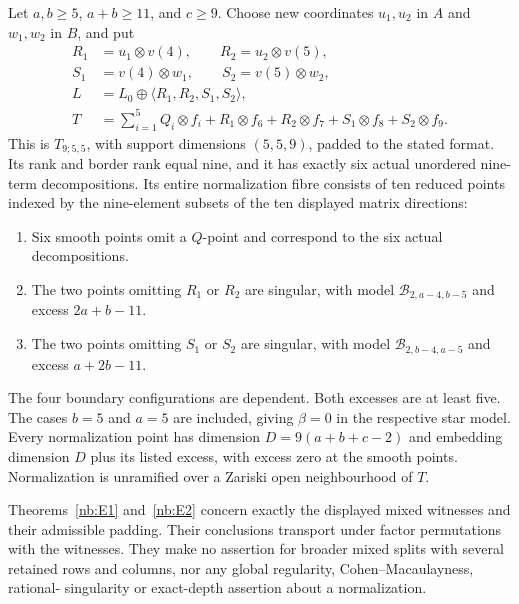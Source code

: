 \begin{theorem}\label{nb:E2}
Let $a,b\geq5$, $a+b\geq11$, and $c\geq9$. Choose new coordinates
$u_1,u_2$ in $A$ and $w_1,w_2$ in $B$, and put
\begin{equation}\label{nb:E2-witness}
 \begin{split}
 R_1&=u_1\otimes v(4),\qquad R_2=u_2\otimes v(5),\\
 S_1&=v(4)\otimes w_1,\qquad S_2=v(5)\otimes w_2,\\
 L&=L_0\oplus\langle R_1,R_2,S_1,S_2\rangle,\\
 T&=\sum_{i=1}^5Q_i\otimes f_i+R_1\otimes f_6+R_2\otimes f_7
                         +S_1\otimes f_8+S_2\otimes f_9.
 \end{split}
\end{equation}
This is $T_{9;5,5}$, with support dimensions $(5,5,9)$, padded to
the stated format. Its rank and border rank equal nine, and it has
exactly six actual unordered nine-term decompositions. Its entire
normalization fibre consists of ten reduced points indexed by the
nine-element subsets of the ten displayed matrix directions:
\begin{enumerate}
\item Six smooth points omit a $Q$-point and correspond to the six
      actual decompositions.
\item The two points omitting $R_1$ or $R_2$ are singular, with
      model $\mathcal B_{2,a-4,b-5}$ and excess $2a+b-11$.
\item The two points omitting $S_1$ or $S_2$ are singular, with
      model $\mathcal B_{2,b-4,a-5}$ and excess $a+2b-11$.
\end{enumerate}
The four boundary configurations are dependent. Both excesses are
at least five. The cases $b=5$ and $a=5$ are included, giving
$\beta=0$ in the respective star model. Every normalization point
has dimension $D=9(a+b+c-2)$ and embedding dimension $D$ plus its
listed excess, with excess zero at the smooth points. Normalization
is unramified over a Zariski open neighbourhood of $T$.
\end{theorem}

Theorems~\ref{nb:E1} and~\ref{nb:E2} concern exactly the displayed
mixed witnesses and their admissible padding. Their conclusions
transport under factor permutations with the witnesses. They make
no assertion for broader mixed splits with several retained rows and
columns, nor any global regularity, Cohen--Macaulayness, rational-
singularity or exact-depth assertion about a normalization.

